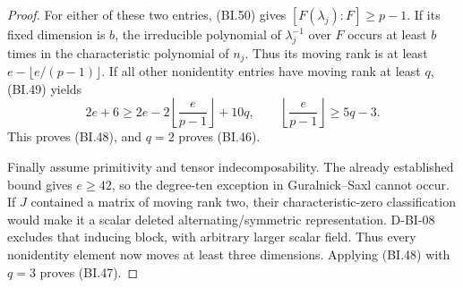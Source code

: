 \begin{proof}
For either of these two entries, (BI.50) gives
$[F(\lambda_j):F]\ge p-1$.  If its fixed dimension is $b$,
the irreducible polynomial of $\lambda_j^{-1}$ over $F$
occurs at least $b$ times in the characteristic polynomial of
$n_j$.  Thus its moving rank is at least
$e-\lfloor e/(p-1)\rfloor$.  If all other nonidentity entries
have moving rank at least $q$, (BI.49) yields
\[
 2e+6\ge2e-2\left\lfloor\frac{e}{p-1}\right\rfloor+10q,
 \qquad
 \left\lfloor\frac{e}{p-1}\right\rfloor\ge5q-3.
\]
This proves (BI.48), and $q=2$ proves (BI.46).

Finally assume primitivity and tensor indecomposability.  The
already established bound gives $e\ge42$, so the degree-ten
exception in Guralnick--Saxl cannot occur.  If $J$ contained a
matrix of moving rank two, their characteristic-zero classification
\cite[Theorem~7.1 and Remark~(3)]{BI:GS} would make it a scalar
deleted alternating/symmetric representation.  D-BI-08 excludes
that inducing block, with arbitrary larger scalar field.  Thus
every nonidentity element now moves at least three dimensions.
Applying (BI.48) with $q=3$ proves (BI.47).
\end{proof}
